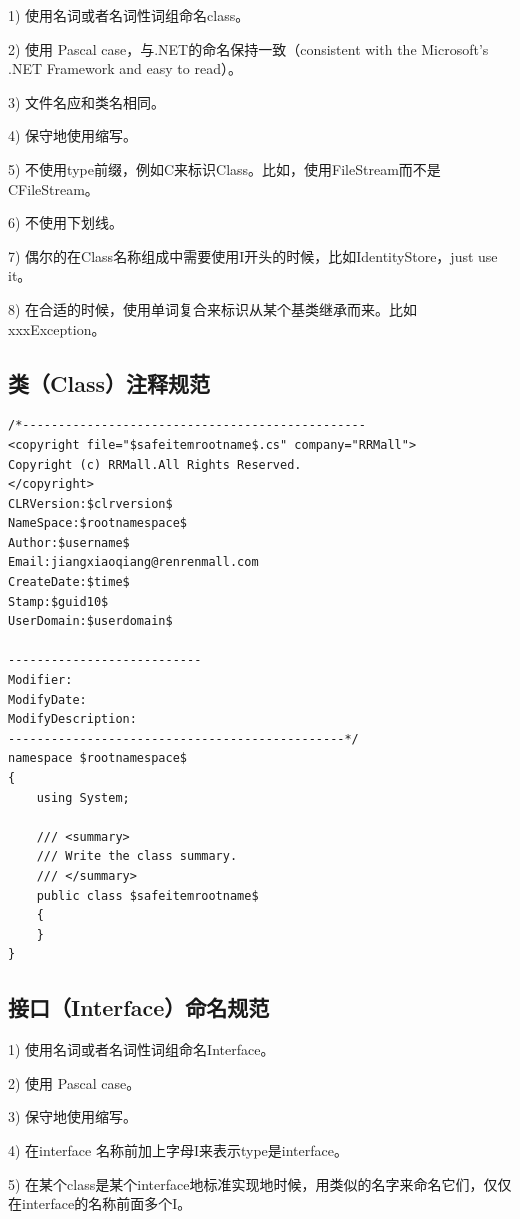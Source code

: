 \documentclass{book}
\begin{document}
1)  使用名词或者名词性词组命名class。

2)  使用 Pascal case，与.NET的命名保持一致（consistent with the Microsoft's .NET Framework and easy to read）。

3)  文件名应和类名相同。

4)  保守地使用缩写。

5)  不使用type前缀，例如C来标识Class。比如，使用FileStream而不是CFileStream。

6)  不使用下划线。

7)  偶尔的在Class名称组成中需要使用I开头的时候，比如IdentityStore，just use it。

8)  在合适的时候，使用单词复合来标识从某个基类继承而来。比如xxxException。

\subsection{类（Class）注释规范}\label{ClassNamingSpecification}

\begin{lstlisting}[language={[Sharp]C}]
/*------------------------------------------------
<copyright file="$safeitemrootname$.cs" company="RRMall">
Copyright (c) RRMall.All Rights Reserved.
</copyright>
CLRVersion:$clrversion$
NameSpace:$rootnamespace$ 
Author:$username$
Email:jiangxiaoqiang@renrenmall.com
CreateDate:$time$
Stamp:$guid10$
UserDomain:$userdomain$

---------------------------
Modifier:
ModifyDate:
ModifyDescription:
-----------------------------------------------*/
namespace $rootnamespace$
{
	using System;
	
	/// <summary>
    /// Write the class summary. 
    /// </summary>
    public class $safeitemrootname$
    {
    }
}		
\end{lstlisting}

\subsection{接口（Interface）命名规范}

1)  使用名词或者名词性词组命名Interface。

2)  使用 Pascal case。

3)  保守地使用缩写。

4)  在interface 名称前加上字母I来表示type是interface。

5)  在某个class是某个interface地标准实现地时候，用类似的名字来命名它们，仅仅在interface的名称前面多个I。
\end{document}
